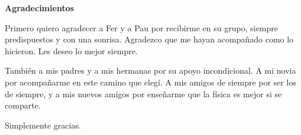 \newenvironment{agradecimientos}%
{\thispagestyle{empty} \cleardoublepage\null \thispagestyle{empty} \vfill\begin{center}%
\textbf{Agradecimientos} \end{center}}%
{\thispagestyle{empty} \vfill\null }

\begin{agradecimientos}
Primero quiero agradecer a Fer y a Pau por recibirme en su grupo, siempre predispuestos y con una sonrisa. Agradezco que me hayan acompañado como lo hicieron. Les deseo lo mejor siempre.

También a mis padres y a mis hermanas por su apoyo incondicional. A mi novia por acompañarme en este camino que elegí. A mis amigos de siempre por ser los de siempre, y a mis nuevos amigos por enseñarme que la física es mejor si se comparte. 

Simplemente gracias.

\end{agradecimientos}
%
%
% 
\null